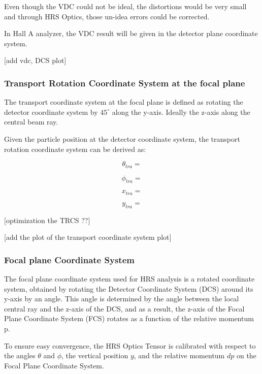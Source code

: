 Even though the VDC could not be ideal, the distortions would be very small and through HRS Optics, those un-idea errors could be corrected. 

In Hall A analyzer, the VDC result will be given in the detector plane coordinate system.

[add vdc, DCS plot]

\subsubsection{Transport Rotation Coordinate System at the focal plane}
The transport coordinate system at the focal plane is defined as rotating the detector coordinate system by $45^{\circ}$ along the y-axis. Ideally the z-axis along the central beam ray. 

Given the particle position at the detector coordinate system, the transport rotation coordinate system can be derived as:

\begin{equation}
    \theta_{tra}  = 
\end{equation}

\begin{equation}
    \phi_{tra} =
\end{equation}

\begin{equation}
    x_{tra} =
\end{equation}

\begin{equation}
    y_{tra} = 
\end{equation}


[optimization the TRCS ??]


[add the plot of the transport coordinate system plot]


\subsubsection{Focal plane Coordinate System}

The focal plane coordinate system used for HRS analysis is a rotated coordinate system, obtained by rotating the Detector Coordinate System (DCS) around its y-axis by an angle. This angle is determined by the angle between the local central ray and the z-axis of the DCS, and as a result, the z-axis of the Focal Plane Coordinate System (FCS) rotates as a function of the relative momentum p.

To ensure easy convergence, the HRS Optics Tensor is calibrated with respect to the angles $\theta$ and $\phi$, the vertical position $y$, and the relative momentum $dp$ on the Focal Plane Coordinate System.


